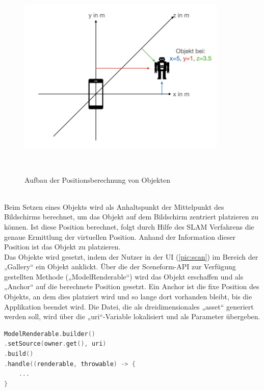 \begin{figure}[hbt!]
    \centering
    \includegraphics[width=10cm,height=10cm,keepaspectratio]{4Umsetzung/Bilder/koordin.jpeg}
    \caption{Aufbau der Positionsberechnung von Objekten}
    \label{pic:koordin}
\end{figure}
\\ 
Beim Setzen eines Objekts wird als Anhaltspunkt der Mittelpunkt des Bildschirms berechnet, um das Objekt auf dem Bildschirm zentriert platzieren zu können. Ist 
diese Position berechnet, folgt durch Hilfe des \acs{SLAM} Verfahrens die genaue Ermittlung der virtuellen Position. Anhand der Information dieser Position 
ist das Objekt zu platzieren. 
\\ 
Das Objekte wird gesetzt, indem der Nutzer in der \acs{UI} (\ref{pic:scan}) im Bereich der „Gallery“ ein Objekt anklickt.
Über die der Sceneform-\acs{API} zur Verfügung gestellten Methode („ModelRenderable“) wird das Objekt erschaffen und als „Anchor“ auf die berechnete Position 
gesetzt. Ein Anchor ist die fixe Position des Objekts, an dem dies platziert wird und so lange dort vorhanden bleibt, bis die Applikation beendet wird. Die Datei, 
die als dreidimensionales „asset“ generiert werden soll, wird über die „uri“-Variable lokalisiert und als Parameter übergeben. 
\begin{lstlisting}[language=C,
    frame=lines,           % Ein Rahmen um den Code (single for box, lines for top and bottom)
    xleftmargin=\parindent,  % Rahmen link von den Zahlen
    style=algoBericht,
    label={code:modelrenderable},
    captionpos=b,           % Caption unter den Code setzen
caption={ModelRenderable Builder}]
ModelRenderable.builder()
.setSource(owner.get(), uri)
.build()
.handle((renderable, throwable) -> {
    ...
}
\end{lstlisting}
